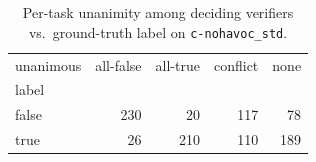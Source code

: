 \begin{table}[t]
  \centering
  \caption{Per-task unanimity among deciding verifiers vs.\ ground-truth label on \texttt{c-nohavoc_std}.}
  \label{tab:unanimous-c-nohavoc_std}
\begin{tabular}{lrrrr}
\toprule
unanimous & all-false & all-true & conflict & none \\
label &  &  &  &  \\
\midrule
false & 230 & 20 & 117 & 78 \\
true & 26 & 210 & 110 & 189 \\
\bottomrule
\end{tabular}
\end{table}
